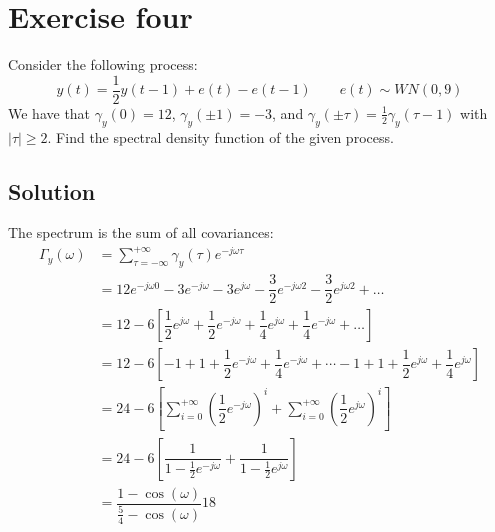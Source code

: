 \section{Exercise four}

Consider the following process:
\[y(t)=\dfrac{1}{2}y(t-1)+e(t)-e(t-1) \qquad e(t)\sim WN(0,9)\]
We have that $\gamma_y(0)=12$, $\gamma_y(\pm 1)=-3$, and $\gamma_y(\pm\tau)=\frac{1}{2}\gamma_y(\tau-1)$ with $\left\lvert \tau \right\rvert  \geq 2$. 
Find the spectral density function of the given process.

\subsection*{Solution}
The spectrum is the sum of all covariances:
\begin{align*}
    \Gamma_y(\omega)    &=\sum_{\tau=-\infty}^{+\infty}\gamma_y(\tau)e^{-j\omega\tau} \\
                        &=12e^{-j\omega 0}-3e^{-j\omega}-3e^{j\omega}-\dfrac{3}{2}e^{-j\omega 2}-\dfrac{3}{2}e^{j\omega 2}+\dots \\
                        &= 12-6\left[\dfrac{1}{2}e^{j\omega}+\dfrac{1}{2}e^{-j\omega}+\dfrac{1}{4}e^{j\omega}+\dfrac{1}{4}e^{-j\omega}+\dots \right] \\
                        &= 12-6\left[-1+1+\dfrac{1}{2}e^{-j\omega}+\dfrac{1}{4}e^{-j\omega}+\cdots-1+1+\dfrac{1}{2}e^{j\omega}+\dfrac{1}{4}e^{j\omega} \right] \\  
                        &= 24-6\left[\sum_{i=0}^{+\infty}{\left(\dfrac{1}{2}e^{-j\omega}\right)}^i+ \sum_{i=0}^{+\infty}{\left(\dfrac{1}{2}e^{j\omega}\right)}^i\right] \\  
                        &= 24-6\left[\dfrac{1}{1-\frac{1}{2}e^{-j\omega}}+ \dfrac{1}{1-\frac{1}{2}e^{j\omega}}\right] \\        
                        &=\dfrac{1-\cos(\omega)}{\frac{5}{4}-\cos(\omega)}18
\end{align*}